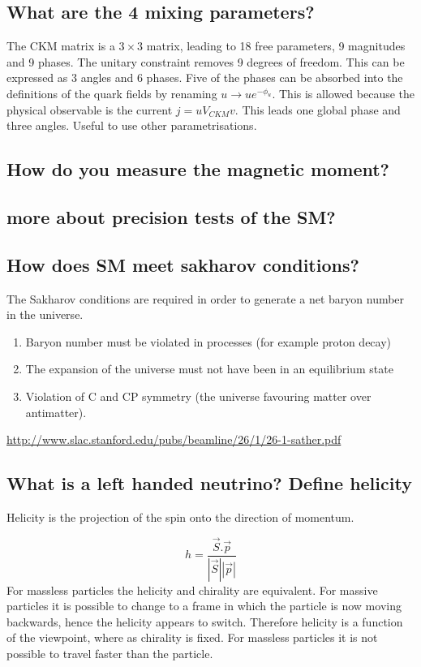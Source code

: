 \documentclass[12pt]{article}
\begin{document}
\subsection{What are the 4 mixing parameters?}
The CKM matrix is a $3\times3$ matrix, leading to 18 free parameters, 9 magnitudes and 9 phases. The unitary constraint removes 9 degrees of freedom. This can be expressed as 3 angles and 6 phases. Five of the phases can be absorbed into the definitions of the quark fields by renaming $u \rightarrow u e^{-\phi_{u}}$. This is allowed because the physical observable is the current $j = u V_{CKM} v$. This leads one global phase and three angles.
Useful to use other parametrisations. 


\subsection{How do you measure the magnetic moment?}

\subsection{more about precision tests of the SM?}
\subsection{How does SM meet sakharov conditions?}
The Sakharov conditions are required in order to generate a net baryon number in the universe.

\begin{enumerate}
\item Baryon number must be violated in processes (for example proton decay)
\item The expansion of the universe must not have been in an equilibrium state
\item Violation of C and CP symmetry (the universe favouring matter over antimatter).
\end{enumerate}

\url{http://www.slac.stanford.edu/pubs/beamline/26/1/26-1-sather.pdf}
\subsection{What is a left handed neutrino? Define helicity}
Helicity is the projection of the spin onto the direction of momentum. 

\begin{equation}
h = \frac{\vec{S}.\vec{p}}{|\vec{S}| |\vec{p}|}
\end{equation}
For massless particles the helicity and chirality are equivalent. For massive particles it is possible to change to a frame in which the particle is now moving backwards, hence the helicity appears to switch. Therefore helicity is a function of the viewpoint, where as chirality is fixed. For massless particles it is not possible to travel faster than the particle. 
\end{document}
